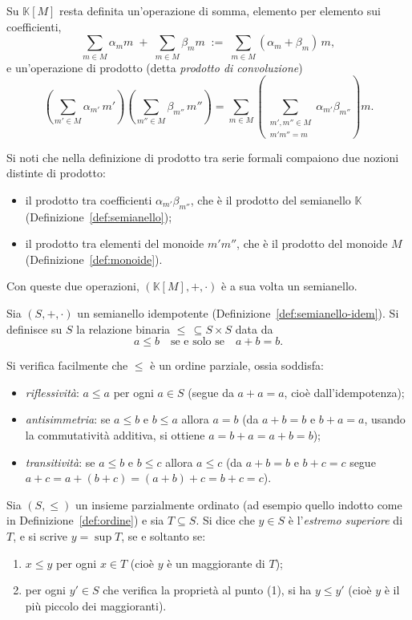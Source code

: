 Su $\mathbb{K}[M]$ resta definita un'operazione di somma, elemento per elemento sui coefficienti,
\[\sum_{m\in M}\alpha_m m \;+\; \sum_{m\in M}\beta_m m \;:=\; \sum_{m\in M}(\alpha_m+\beta_m)\, m,\]
e un'operazione di prodotto (detta \emph{prodotto di convoluzione})
\[\left(\sum_{m'\in M} \alpha_{m'}\, m'\right) \left(\sum_{m''\in M} \beta_{m''}\, m''\right) = \sum_{m\in M} \left( \sum_{\substack{m',m''\in M \\ m'm''=m}} \alpha_{m'}\beta_{m''} \right) m.\]

Si noti che nella definizione di prodotto tra serie formali compaiono due nozioni distinte di prodotto:
\begin{itemize}
    \item il prodotto tra coefficienti $\alpha_{m'}\beta_{m''}$, che è il prodotto del semianello $\mathbb{K}$ (Definizione~\ref{def:semianello});
    \item il prodotto tra elementi del monoide $m'm''$, che è il prodotto del monoide $M$ (Definizione~\ref{def:monoide}).
\end{itemize}
Con queste due operazioni, $(\mathbb{K}[M],+,\cdot)$ è a sua volta un semianello.

\begin{defi}\label{def:ordine}
Sia $(S,+,\cdot)$ un semianello idempotente (Definizione~\ref{def:semianello-idem}). Si definisce su $S$ la relazione binaria $\leq\,\subseteq S\times S$ data da
\[a\leq b \quad\text{se e solo se}\quad a+b=b.\]
\end{defi}

Si verifica facilmente che $\leq$ è un ordine parziale, ossia soddisfa:
\begin{itemize}
    \item \emph{riflessività}: $a\leq a$ per ogni $a\in S$ (segue da $a+a=a$, cioè dall'idempotenza);
    \item \emph{antisimmetria}: se $a\leq b$ e $b\leq a$ allora $a=b$ (da $a+b=b$ e $b+a=a$, usando la commutatività additiva, si ottiene $a=b+a=a+b=b$);
    \item \emph{transitività}: se $a\leq b$ e $b\leq c$ allora $a\leq c$ (da $a+b=b$ e $b+c=c$ segue $a+c = a+(b+c)=(a+b)+c=b+c=c$).
\end{itemize}

\begin{defi}\label{def:sup}
Sia $(S,\leq)$ un insieme parzialmente ordinato (ad esempio quello indotto come in Definizione~\ref{def:ordine}) e sia $T\subseteq S$. Si dice che $y\in S$ è l'\emph{estremo superiore} di $T$, e si scrive $y=\sup T$, se e soltanto se:
\begin{enumerate}
    \item $x\leq y$ per ogni $x\in T$ (cioè $y$ è un maggiorante di $T$);
    \item per ogni $y'\in S$ che verifica la proprietà al punto (1), si ha $y\leq y'$ (cioè $y$ è il più piccolo dei maggioranti).
\end{enumerate}
\end{defi}

